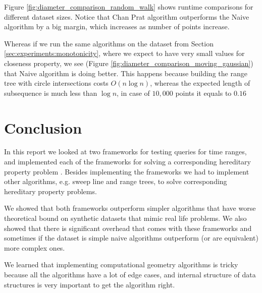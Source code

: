 \documentclass{article}
\begin{document}
Figure \ref{fig:diameter_comparison_random_walk} shows runtime
comparisons for different dataset sizes. Notice that Chan Prat
algorithm outperforms the Naive algorithm by a big margin, which
increases as number of points increase.

Whereas if we run the same algorithms on the dataset from Section
\ref{sec:experiments:monotonicity}, where we expect to have very
small values for closeness property, we see (Figure
\ref{fig:diameter_comparison_moving_gaussian}) that Naive algorithm
is doing better. This happens because building the range tree with
circle intersections costs $O(n \log n)$, whereas the expected
length of subsequence is much less than $\log n$, in case of $10,000$
points it equals to $0.16$

\section{Conclusion}
\label{sec:conclusion}

In this report we looked at two frameworks for testing queries for
time ranges\cite{bokal2015, chan2016}, and implemented each of the
frameworks for solving a corresponding hereditary property problem
\cite{report_code}. Besides implementing the frameworks we had to
implement other algorithms, e.g. sweep line and range trees, to
solve corresponding hereditary property problems.

We showed that both frameworks outperform simpler algorithms that
have worse theoretical bound on synthetic datasets that mimic real
life problems. We also showed that there is significant overhead
that comes with these frameworks and sometimes if the dataset is
simple naive algorithms outperform (or are equivalent) more
complex ones.

We learned that implementing computational geometry algorithms is
tricky because all the algorithms have a lot of edge cases, and
internal structure of data structures is very important to get the
algorithm right.



\end{document}
